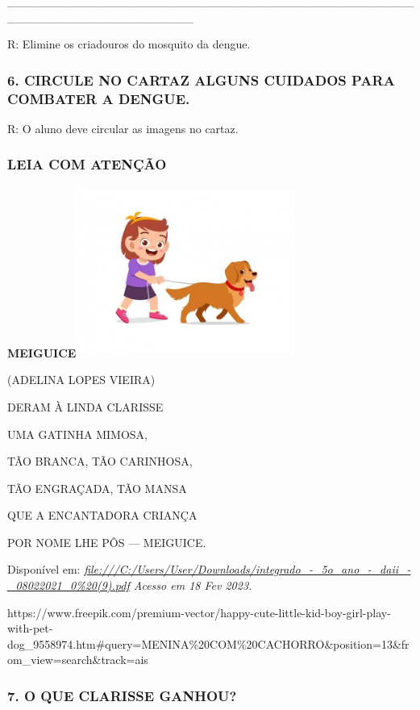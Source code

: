 \_\_\_\_\_\_\_\_\_\_\_\_\_\_\_\_\_\_\_\_\_\_\_\_\_\_\_\_\_\_\_\_\_\_\_\_\_\_\_\_\_\_\_\_\_\_\_\_\_\_\_\_\_\_\_\_\_\_\_\_\_\_\_\_\_\_\_\_\_\_

R: Elimine os criadouros do mosquito da dengue.

\subsubsection{6. CIRCULE NO CARTAZ ALGUNS CUIDADOS PARA COMBATER A
DENGUE.}\label{circule-no-cartaz-alguns-cuidados-para-combater-a-dengue.}

R: O aluno deve circular as imagens no cartaz.

\subsubsection{LEIA COM ATENÇÃO}\label{leia-com-atenuxe7uxe3o}

\textbf{MEIGUICE}\includegraphics[width=2.83472in,height=2.19792in]{media/image128.jpg}

(ADELINA LOPES VIEIRA)

DERAM À LINDA CLARISSE

\protect\hypertarget{_heading=h.44sinio}{}{}UMA GATINHA MIMOSA,

TÃO BRANCA, TÃO CARINHOSA,

TÃO ENGRAÇADA, TÃO MANSA

QUE A ENCANTADORA CRIANÇA

POR NOME LHE PÔS --- MEIGUICE.

Disponível em:
\emph{\href{about:blank}{file:///C:/Users/User/Downloads/integrado\_-\_5o\_ano\_-\_daii\_-\_08022021\_0\%20(9).pdf}
Acesso em 18 Fev 2023.}

https://www.freepik.com/premium-vector/happy-cute-little-kid-boy-girl-play-with-pet-dog\_9558974.htm\#query=MENINA\%20COM\%20CACHORRO\&position=13\&from\_view=search\&track=ais

\subsubsection{7. O QUE CLARISSE GANHOU?}\label{o-que-clarisse-ganhou}

